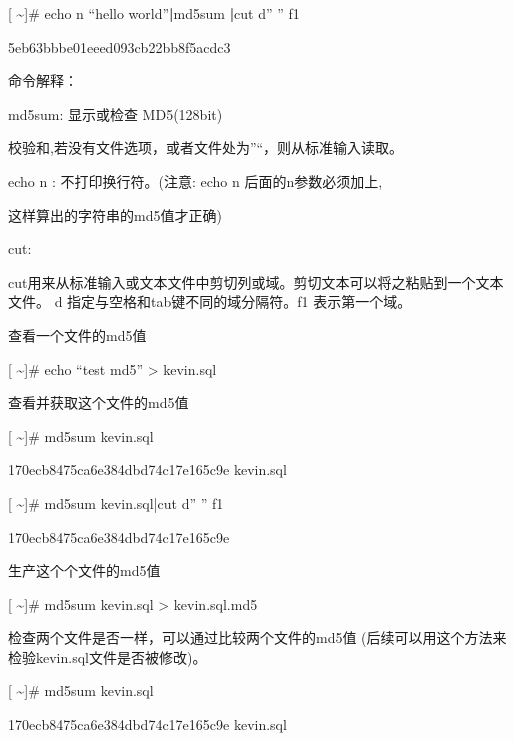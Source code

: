\documentclass[letterpaper,12pt,english]{sphinxmanual}
\begin{document}

{[} \textasciitilde{}{]}\# echo \sphinxhyphen{}n “hello world”{\color{red}\bfseries{}|}md5sum {\color{red}\bfseries{}|}cut \sphinxhyphen{}d” ” \sphinxhyphen{}f1

5eb63bbbe01eeed093cb22bb8f5acdc3

命令解释：

md5sum: 显示或检查 MD5(128\sphinxhyphen{}bit)

校验和,若没有文件选项，或者文件处为”\sphinxhyphen{}“，则从标准输入读取。

echo \sphinxhyphen{}n : 不打印换行符。(注意: echo \sphinxhyphen{}n 后面的\sphinxhyphen{}n参数必须加上,

这样算出的字符串的md5值才正确)

cut:

cut用来从标准输入或文本文件中剪切列或域。剪切文本可以将之粘贴到一个文本文件。 \sphinxhyphen{}d 指定与空格和tab键不同的域分隔符。\sphinxhyphen{}f1 表示第一个域。

查看一个文件的md5值

{[} \textasciitilde{}{]}\# echo “test md5” > kevin.sql

查看并获取这个文件的md5值

{[} \textasciitilde{}{]}\# md5sum kevin.sql

170ecb8475ca6e384dbd74c17e165c9e  kevin.sql

{[} \textasciitilde{}{]}\# md5sum kevin.sql|cut \sphinxhyphen{}d” ” \sphinxhyphen{}f1

170ecb8475ca6e384dbd74c17e165c9e

生产这个个文件的md5值

{[} \textasciitilde{}{]}\# md5sum kevin.sql > kevin.sql.md5

检查两个文件是否一样，可以通过比较两个文件的md5值 (后续可以用这个方法来检验kevin.sql文件是否被修改)。

{[} \textasciitilde{}{]}\# md5sum kevin.sql

170ecb8475ca6e384dbd74c17e165c9e  kevin.sql
\end{document}
